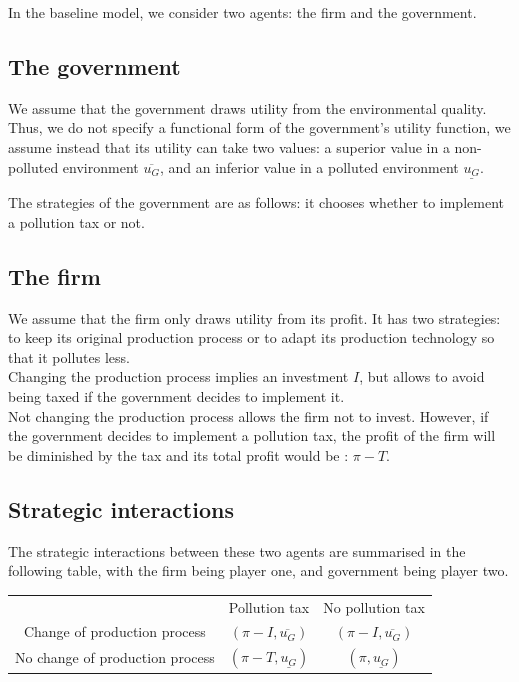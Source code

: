 \documentclass{article}
\begin{document}
In the baseline model, we consider two agents: the firm and the government.

\subsection{The government}

We assume that the government draws utility from the environmental quality. 
Thus, we do not specify a functional form of the government's utility function, we assume instead that its utility can take two values: a superior value in a non-polluted environment $\overline{u_{G}}$, and an inferior value in a polluted environment $\underline{u_{G}}$.

The strategies of the government are as follows: it chooses whether to implement a pollution tax or not.

\subsection{The firm}

We assume that the firm only draws utility from its profit.
It has two strategies: to keep its original production process or to adapt its production technology so that it pollutes less. \\
Changing the production process implies an investment $I$, but allows to avoid being taxed if the government decides to implement it. \\
Not changing the production process allows the firm not to invest.
However, if the government decides to implement a pollution tax, the profit of the firm will be diminished by the tax and its total profit would be : $\pi-T$.

\subsection{Strategic interactions}

The strategic interactions between these two agents are summarised in the following table, with the firm being player one, and government being player two. 

\begin{center}
    \begin{tabular}{ |c|c|c| } 
     \hline
     &Pollution tax & No pollution tax \\ 
     Change of production process & $\left(\pi-I,\overline{u_{G}}\right)$ & $\left(\pi-I,\overline{u_{G}}\right)$  \\ 
     No change of production process & $\left(\pi-T,\underline{u_{G}}\right)$ & $\left(\pi,\underline{u_{G}}\right)$ \\ 
     \hline
    \end{tabular}
    \end{center}
\end{document}
